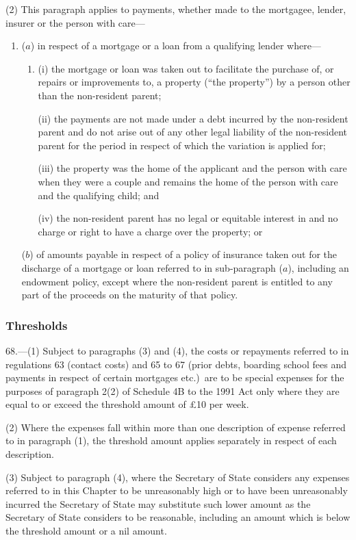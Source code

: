 \documentclass[12pt,a4paper]{article}
\begin{document}
(2) This paragraph applies to payments, whether made to the mortgagee, lender, insurer or the person with care—
\begin{enumerate}\item[]
($a$) in respect of a mortgage or a loan from a qualifying lender where—
\begin{enumerate}\item[]
(i) the mortgage or loan was taken out to facilitate the purchase of, or repairs or improvements to, a property (“the property”) by a person other than the non-resident parent;

(ii) the payments are not made under a debt incurred by the non-resident parent and do not arise out of any other legal liability of the non-resident parent for the period in respect of which the variation is applied for;

(iii) the property was the home of the applicant and the person with care when they were a couple and remains the home of the person with care and the qualifying child; and

(iv) the non-resident parent has no legal or equitable interest in and no charge or right to have a charge over the property; or
\end{enumerate}

($b$) of amounts payable in respect of a policy of insurance taken out for the discharge of a mortgage or loan referred to in sub-paragraph ($a$), including an endowment policy, except where the non-resident parent is entitled to any part of the proceeds on the maturity of that policy.
\end{enumerate}

\subsubsection[68. Thresholds]{Thresholds}

68.---(1)  Subject to paragraphs (3) and (4), the costs or repayments referred to in regulations 63 (contact costs) and 65 to 67 (prior debts, boarding school fees and payments in respect of certain mortgages etc.)\ are to be special expenses for the purposes of paragraph 2(2) of Schedule 4B to the 1991 Act only where they are equal to or exceed the threshold amount of £10 per week.

(2) Where the expenses fall within more than one description of expense referred to in paragraph (1), the threshold amount applies separately in respect of each description.

(3) Subject to paragraph (4), where the Secretary of State considers any expenses referred to in this Chapter to be unreasonably high or to have been unreasonably incurred the Secretary of State may substitute such lower amount as the Secretary of State considers to be reasonable, including an amount which is below the threshold amount or a nil amount.
\end{document}
